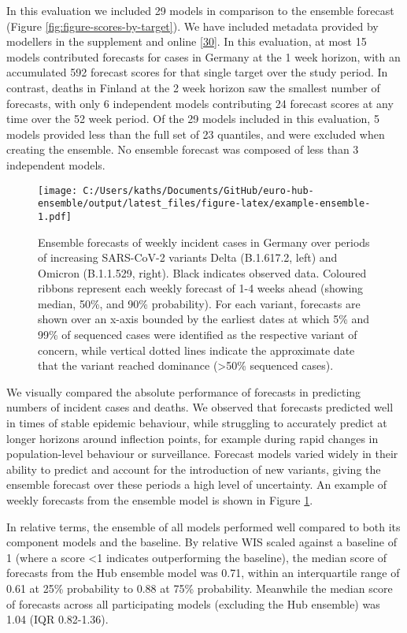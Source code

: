 \documentclass[
]{article}
\begin{document}
In this evaluation we included 29 models in comparison to the ensemble forecast (Figure \ref{fig:figure-scores-by-target}). We have included metadata provided by modellers in the supplement and online \protect\hyperlink{ref-katharine_sherratt_2022_7356267}{{[}30{]}}. In this evaluation, at most 15 models contributed forecasts for cases in Germany at the 1 week horizon, with an accumulated 592 forecast scores for that single target over the study period. In contrast, deaths in Finland at the 2 week horizon saw the smallest number of forecasts, with only 6 independent models contributing 24 forecast scores at any time over the 52 week period. Of the 29 models included in this evaluation, 5 models provided less than the full set of 23 quantiles, and were excluded when creating the ensemble. No ensemble forecast was composed of less than 3 independent models.

\begin{figure}
\centering
\texttt{[image: C:/Users/kaths/Documents/GitHub/euro-hub-ensemble/output/latest\_files/figure-latex/example-ensemble-1.pdf]}
\caption{\label{fig:example-ensemble}Ensemble forecasts of weekly incident cases in Germany over periods of increasing SARS-CoV-2 variants Delta (B.1.617.2, left) and Omicron (B.1.1.529, right). Black indicates observed data. Coloured ribbons represent each weekly forecast of 1-4 weeks ahead (showing median, 50\%, and 90\% probability). For each variant, forecasts are shown over an x-axis bounded by the earliest dates at which 5\% and 99\% of sequenced cases were identified as the respective variant of concern, while vertical dotted lines indicate the approximate date that the variant reached dominance (\textgreater50\% sequenced cases).}
\end{figure}

We visually compared the absolute performance of forecasts in predicting numbers of incident cases and deaths. We observed that forecasts predicted well in times of stable epidemic behaviour, while struggling to accurately predict at longer horizons around inflection points, for example during rapid changes in population-level behaviour or surveillance. Forecast models varied widely in their ability to predict and account for the introduction of new variants, giving the ensemble forecast over these periods a high level of uncertainty. An example of weekly forecasts from the ensemble model is shown in Figure \ref{fig:example-ensemble}.

In relative terms, the ensemble of all models performed well compared to both its component models and the baseline. By relative WIS scaled against a baseline of 1 (where a score \textless1 indicates outperforming the baseline), the median score of forecasts from the Hub ensemble model was 0.71, within an interquartile range of 0.61 at 25\% probability to 0.88 at 75\% probability. Meanwhile the median score of forecasts across all participating models (excluding the Hub ensemble) was 1.04 (IQR 0.82-1.36).
\end{document}
